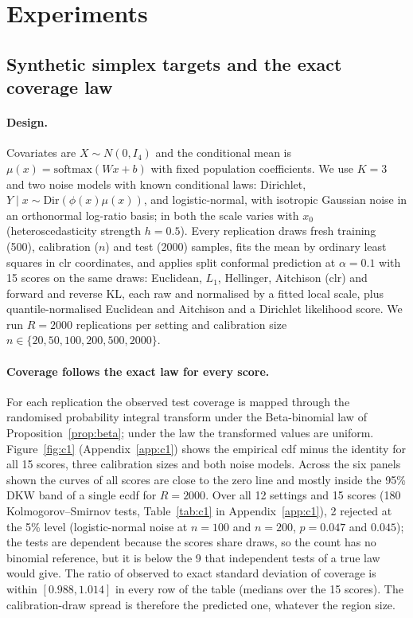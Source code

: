 \section{Experiments}\label{sec:experiments}

\subsection{Synthetic simplex targets and the exact coverage law}
\label{sec:exp_law}
\paragraph{Design.}
Covariates are $X\sim N(0,I_4)$ and the conditional mean is $\mu(x)=\mathrm{softmax}(Wx+b)$ with fixed population coefficients.
We use $K=3$ and two noise models with known conditional laws: Dirichlet, $Y\mid x\sim\mathrm{Dir}(\phi(x)\mu(x))$, and logistic-normal, with isotropic Gaussian noise in an orthonormal log-ratio basis; in both the scale varies with $x_0$ (heteroscedasticity strength $h=0.5$).
Every replication draws fresh training (500), calibration ($n$) and test (2000) samples, fits the mean by ordinary least squares in clr coordinates, and applies split conformal prediction at $\alpha=0.1$ with 15 scores on the same draws: Euclidean, $L_1$, Hellinger, Aitchison (clr) and forward and reverse KL, each raw and normalised by a fitted local scale, plus quantile-normalised Euclidean and Aitchison and a Dirichlet likelihood score.
We run $R=2000$ replications per setting and calibration size $n\in\{20,50,100,200,500,2000\}$.

\paragraph{Coverage follows the exact law for every score.}
For each replication the observed test coverage is mapped through the randomised probability integral transform under the Beta-binomial law of Proposition~\ref{prop:beta}; under the law the transformed values are uniform.
Figure~\ref{fig:c1} (Appendix~\ref{app:c1}) shows the empirical cdf minus the identity for all 15 scores, three calibration sizes and both noise models.
Across the six panels shown the curves of all scores are close to the zero line and mostly inside the 95\% DKW band of a single ecdf for $R=2000$.
Over all 12 settings and 15 scores (180 Kolmogorov--Smirnov tests, Table~\ref{tab:c1} in Appendix~\ref{app:c1}), 2 rejected at the 5\% level (logistic-normal noise at $n=100$ and $n=200$, $p=0.047$ and $0.045$); the tests are dependent because the scores share draws, so the count has no binomial reference, but it is below the 9 that independent tests of a true law would give.
The ratio of observed to exact standard deviation of coverage is within $[0.988,1.014]$ in every row of the table (medians over the 15 scores).
The calibration-draw spread is therefore the predicted one, whatever the region size.

